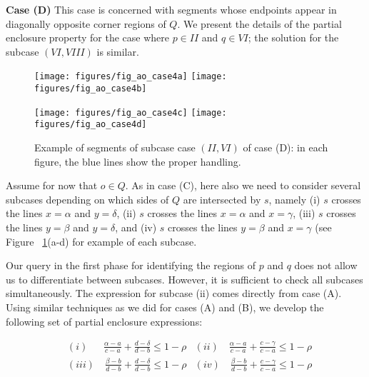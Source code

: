 {\bf Case (D)}
This case is concerned with segments whose endpoints appear in 
diagonally opposite corner regions of $Q$. We present the details 
of the partial enclosure property for the case where $p \in II$ 
and $q \in VI$; the solution for the subcase $(VI, VIII)$ is similar.

\begin{figure}[t]
\begin{center}
  \texttt{[image: figures/fig\_ao\_case4a]}
  \hspace{1.0em}
  \texttt{[image: figures/fig\_ao\_case4b]}

  \vspace{2.0em}
  
  \texttt{[image: figures/fig\_ao\_case4c]}
  \hspace{1.0em}
  \texttt{[image: figures/fig\_ao\_case4d]}

  \caption{Example of segments of subcase case $(II, VI)$ of case (D): 
  in each figure, the blue lines show the proper handling.}
  \label{fig:rectangles:ao:case4}
\end{center}
\end{figure}

Assume for now that $o \in Q$. As in case (C), here also we need to 
consider several subcases depending on which sides of $Q$ are 
intersected by $s$, namely (i) $s$ crosses the lines $x=\alpha$ and 
$y=\delta$, (ii) $s$ crosses the lines $x=\alpha$ and $x=\gamma$, 
(iii) $s$ crosses the lines $y=\beta$ and $y=\delta$, and (iv)
$s$ crosses the lines $y=\beta$ and $x=\gamma$ (see Figure~
\ref{fig:rectangles:ao:case4}(a-d) for example of each subcase. 

Our query in the first phase for identifying the regions of $p$ and $q$ 
does not allow us to differentiate between subcases. However, 
it is sufficient to check all subcases simultaneously. The 
expression for subcase (ii) comes directly from case (A).
Using similar techniques as we did for cases (A) and (B), 
we develop the following set of partial enclosure expressions:

\begin{align*}
& (i) \quad \; \; \frac{\alpha - a}{c - a} + \frac{d - \delta}{d - b} \leq 1 - \rho
& (ii) \quad \frac{\alpha - a}{c - a} + \frac{c - \gamma}{c - a} \leq 1 - \rho \\
& (iii) \quad \frac{\beta  - b}{d - b} + \frac{d - \delta}{d - b} \leq 1 - \rho  
& (iv) \quad \frac{\beta  - b}{d - b} + \frac{c - \gamma}{c - a} \leq 1 - \rho \\
\end{align*}

